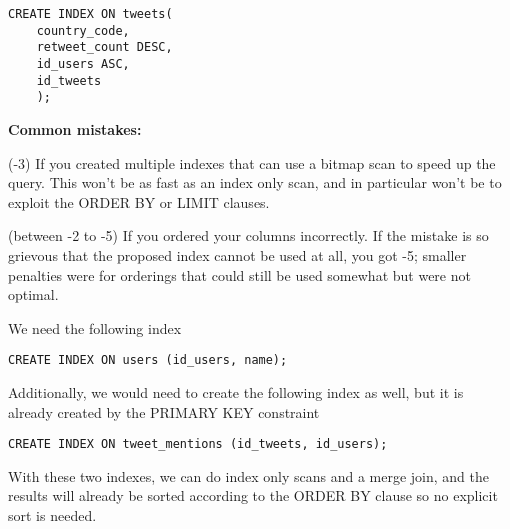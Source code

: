 \documentclass[12pt]{exam}
\theoremstyle{definition}
\begin{document}
\begin{questions}
\newpage
{}
\begin{solution}
\begin{lstlisting}
CREATE INDEX ON tweets(
    country_code,
    retweet_count DESC,
    id_users ASC,
    id_tweets
    );
\end{lstlisting}

\textbf{Common mistakes:}

(-3)
If you created multiple indexes that can use a bitmap scan to speed up the query.
This won't be as fast as an index only scan, and in particular won't be to exploit the ORDER BY or LIMIT clauses.

(between -2 to -5) 
If you ordered your columns incorrectly.
If the mistake is so grievous that the proposed index cannot be used at all, you got -5;
smaller penalties were for orderings that could still be used somewhat but were not optimal.
\end{solution}
\vspace{2in}


\newpage
{}

\begin{solution}
We need the following index
\begin{lstlisting}
CREATE INDEX ON users (id_users, name);
\end{lstlisting}
Additionally, we would need to create the following index as well, but it is already created by the PRIMARY KEY constraint
\begin{lstlisting}
CREATE INDEX ON tweet_mentions (id_tweets, id_users);
\end{lstlisting}
With these two indexes, we can do index only scans and a merge join, and the results will already be sorted according to the ORDER BY clause so no explicit sort is needed.


\end{solution}
\end{questions}
\end{document}
